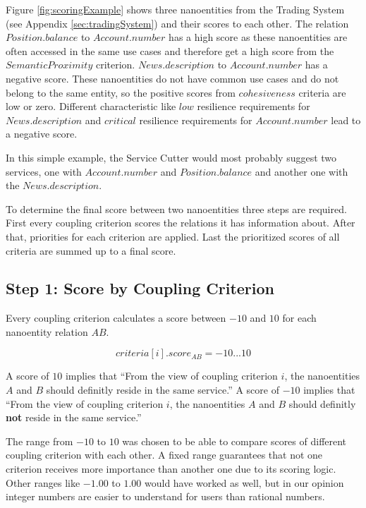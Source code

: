 Figure \ref{fig:scoringExample} shows three nanoentities from the Trading System (see Appendix \ref{sec:tradingSystem}) and their scores to each other. The relation $Position.balance$ to $Account.number$ has a high score as these nanoentities are often accessed in the same use cases and therefore get a high score from the $Semantic Proximity$ criterion. $News.description$ to $Account.number$ has a negative score. These nanoentities do not have common use cases and do not belong to the same entity, so the positive scores from $cohesiveness$ criteria are low or zero. Different characteristic like $low$ resilience requirements for $News.description$ and $critical$ resilience requirements for $Account.number$ lead to a negative score. 

In this simple example, the Service Cutter would most probably suggest two services, one with $Account.number$ and $Position.balance$ and another one with the $News.description$.

To determine the final score between two nanoentities three steps are required. First every coupling criterion scores the relations it has information about. After that, priorities for each criterion are applied. Last the prioritized scores of all criteria are summed up to a final score.

\subsection{Step 1: Score by Coupling Criterion}

Every coupling criterion calculates a score between $-10$ and $10$ for each nanoentity relation $AB$. 

\begin{displaymath}
criteria[i].score_{AB} = -10 ... 10
\end{displaymath}

A score of $10$ implies that \enquote{From the view of coupling criterion $i$, the nanoentities $A$ and $B$ should definitly reside in the same service.} A score of $-10$ implies that \enquote{From the view of coupling criterion $i$, the nanoentities $A$ and $B$ should definitly \textbf{not} reside in the same service.} 

The range from $-10$ to  $10$ was chosen to be able to compare scores of different coupling criterion with each other. A fixed range guarantees that not one criterion receives more importance than another one due to its scoring logic. Other ranges like $-1.00$ to $1.00$ would have worked as well, but in our opinion integer numbers are easier to understand for users than rational numbers. 

